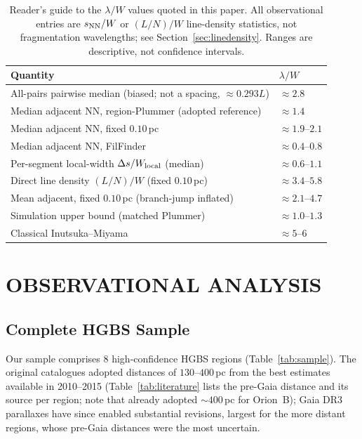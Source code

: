 \documentclass[usenatbib,twoside,twocolumn]{mnras}
\begin{document}
\begin{table}
\caption{Reader's guide to the $\lambda/W$ values quoted in this paper. All observational entries are $s_{\rm NN}/W$ or $(L/N)/W$ line-density statistics, not fragmentation wavelengths; see Section~\ref{sec:linedensity}. Ranges are descriptive, not confidence intervals.}
\label{tab:master}
\footnotesize
\setlength{\tabcolsep}{4pt}
\begin{tabular}{@{}p{5.4cm}l@{}}
\toprule
Quantity & $\lambda/W$ \\
\midrule
All-pairs pairwise median (biased; not a spacing, $\approx0.293L$) & $\approx2.8$ \\
Median adjacent NN, region-Plummer (adopted reference) & $\approx1.4$ \\
Median adjacent NN, fixed $0.10$\,pc & $\approx1.9$--$2.1$ \\
Median adjacent NN, FilFinder & $\approx0.4$--$0.8$ \\
Per-segment local-width $\Delta s/W_{\rm local}$ (median) & $\approx0.6$--$1.1$ \\
Direct line density $(L/N)/W$ (fixed $0.10$\,pc) & $\approx3.4$--$5.8$ \\
Mean adjacent, fixed $0.10$\,pc (branch-jump inflated) & $\approx2.1$--$4.7$ \\
Simulation upper bound (matched Plummer) & $\approx1.0$--$1.3$ \\
Classical Inutsuka--Miyama & $\approx5$--$6$ \\
\bottomrule
\end{tabular}
\end{table}

\section{OBSERVATIONAL ANALYSIS}

\subsection{Complete HGBS Sample}

Our sample comprises 8 high-confidence HGBS regions (Table~\ref{tab:sample}). The original catalogues \citep{Konyves2015, Konyves2020, Ladjelate2020, Pezzuto2021} adopted distances of $130$--$400$\,pc from the best estimates available in 2010--2015 (Table~\ref{tab:literature} lists the pre-Gaia distance and its source per region; note that \citealt{Konyves2020} already adopted $\sim400$\,pc for Orion~B); Gaia DR3 parallaxes \citep{Zhang2023} have since enabled substantial revisions, largest for the more distant regions, whose pre-Gaia distances were the most uncertain.
\end{document}
